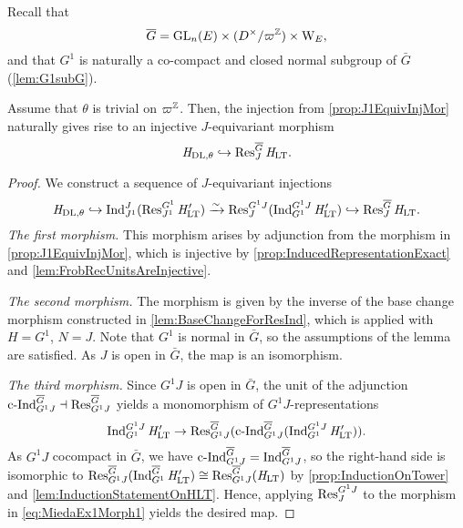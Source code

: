 \documentclass[../main.tex]{subfiles}
\begin{document}
Recall that 
\begin{equation*}
  \overline G = \operatorname{GL}_n(E) \times (D^\times/\varpi^{\mathbb{Z}}) \times \mathrm W_E,
\end{equation*}
and that $G^1$ is naturally a co-compact and closed normal subgroup of $\bar G$
(\cref{lem:G1subG}). 

\begin{lem} \label{lem:JEquivInjMor}
  Assume that $\theta$ is trivial on $\varpi^{\mathbb{Z}}$. Then, the injection from
  \cref{prop:J1EquivInjMor} naturally gives rise to an injective
  $J$-equivariant morphism
  \begin{equation*}
    \mathit H_{\mathrm{DL},\theta} \hookrightarrow \operatorname{Res}_J^{\overline G} \mathit H_{\mathrm{LT}}.
  \end{equation*}
\begin{proof} %
  We construct a sequence of $J$-equivariant injections
  \begin{equation*}
    \mathit H_{\mathrm{DL},\theta} \hookrightarrow \operatorname{Ind}_{J^1}^J (\operatorname{Res}_{J^1}^{G^1} \mathit H'_{\mathrm{LT}}) \\ \xrightarrow{\sim} \operatorname{Res}_J^{G^1J}( \operatorname{Ind}_{G^1}^{G^1J} \mathit H'_{\mathrm{LT}}) \hookrightarrow \operatorname{Res}_J^{\overline G}
    \mathit H_{\mathrm{LT}}.
  \end{equation*}
  \textit{The first morphism.}
  This morphism arises by adjunction from the morphism in 
  \cref{prop:J1EquivInjMor}, which is injective by 
  \cref{prop:InducedRepresentationExact} and \cref{lem:FrobRecUnitsAreInjective}.
  
  \textit{The second morphism.} 
  The morphism is given by the inverse of the base change morphism constructed in
  \cref{lem:BaseChangeForResInd}, which is applied with $H = G^1$, $N = J$. 
  Note that $G^1$ is normal in ${\bar G}$, so the assumptions of the lemma are
  satisfied. As $J$ is open in ${\bar G}$, the map is an isomorphism. 
  
  \textit{The third morphism.}
  Since $G^1J$ is open in ${\bar G}$, the unit of the adjunction $\operatorname{c\text{-}Ind}_{G^1J}^{\overline G} \dashv
  \operatorname{Res}_{G^1J}^{\overline G}$ yields a monomorphism of $G^1J$-representations 
  \begin{equation}\label{eq:MiedaEx1Morph1}
    \operatorname{Ind}_{G^1}^{G^1J} \mathit H_{\mathrm{LT}}' \to \operatorname{Res}_{G^1J}^{\overline G}
    (\operatorname{c\text{-}Ind}_{G^1J}^{\overline G}(\operatorname{Ind}_{G^1}^{G^1J} \mathit H'_{\mathrm{LT}})).
  \end{equation}
  As $G^1J$ cocompact in ${\bar G}$, we have $\operatorname{c\text{-}Ind}_{G^1J}^{\overline G} =
  \operatorname{Ind}_{G^1J}^{\overline G}$, so the right-hand
  side is isomorphic to $\operatorname{Res}_{G^1J}^{\overline G}(\operatorname{Ind}_{G^1}^{\overline G} \mathit H'_{\mathrm{LT}}) \cong
  \operatorname{Res}_{G^1J}^{\overline G}(\mathit H_{\mathrm{LT}})$ by \cref{prop:InductionOnTower} and 
  \cref{lem:InductionStatementOnHLT}. Hence, applying $\operatorname{Res}_J^{G^1J}$ to the
  morphism in \eqref{eq:MiedaEx1Morph1} yields the desired map.
\end{proof} %
\end{lem}
\end{document}
